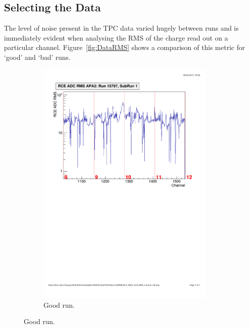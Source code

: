 \subsection{Selecting the Data}\label{sec:SelectingTheData}

The level of noise present in the TPC data varied hugely between runs and is immediately evident when analysing the RMS of the charge read out on a particular channel.  Figure~\ref{fig:DataRMS} shows a comparison of this metric for `good' and `bad' runs.

\begin{figure}
  \centering
  \begin{subfigure}{0.45\linewidth}
    \centering
    \includegraphics[width=0.95\textwidth]{DataRMSGood.pdf}
    \caption{Good run.}
    \label{fig:DataRMSGoodRun}

\end{subfigure}
\end{figure}
